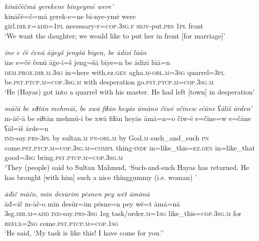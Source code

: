 \ea \label{ŽH.56}
\textit{kināčēčmā gerekene binyeymē were’} \\ 
\gll kināčē=č=mā gerek-e=ne bi-nye-ymē were \\ 
 girl\textsc{.dir}\textsc{\textsc{.f}}\textsc{=add}\textsc{=1pl} necessary\textsc{-f}\textsc{=cop}\textsc{.3sg}\textsc{\textsc{.f}} \textsc{sbjv-}put\textsc{.prs} \textsc{1pl} front \\ 
\glt `We want the daughter; we would like to put her in front [for marriage]'
\z 
 
\ea \label{ŽH.62}
\textit{īne e čē čenū āġeyš jengšā bīyen, be ādizī lūān} \\ 
\gll īne e=čē čenū āġe-ī=š jeng=šā bīye=n be ādizī lūā=n \\ 
 \textsc{dem.prox}\textsc{.dir}\textsc{.m}\textsc{.3sg} in=here with.ez\textsc{.gen} agha\textsc{.m}\textsc{-obl}\textsc{.m}\textsc{=3sg} quarrel\textsc{=3pl} be\textsc{.pst}\textsc{.ptcp}\textsc{.m}\textsc{=cop}\textsc{.3sg}\textsc{.m} with desperation go\textsc{.pst}\textsc{.ptcp}\textsc{.m}\textsc{=cop}\textsc{.3sg}\textsc{.m} \\ 
\glt `He (Hayas) got into a quarrel with his master. He had left [town] in desperation'
\z 
 
\ea \label{ŽH.66}
\textit{māčā be siɫtān mehmūī, be xwā fiɫān heyās āmāno čīwē ečīnew ečāne ʕāliš ārden’} \\ 
\gll m-āč-ā be siɫtān mehmū-ī be xwā fiɫān heyās āmā=n=o čīw-ē e=čīne=w e=čāne ʕāl=iš ārde=n \\ 
 \textsc{ind-}say\textsc{.prs}\textsc{-3pl} by sultan\textsc{.m} \textsc{pn}\textsc{-obl}\textsc{.m} by God\textsc{.m} such\_and\_such \textsc{pn} come\textsc{.pst}\textsc{.ptcp}\textsc{.m}\textsc{=cop}\textsc{.3sg}\textsc{.m}\textsc{=compl} thing\textsc{-indf} in=like\_this\textsc{=ez}\textsc{.gen} in=like\_that good\textsc{=3sg} bring\textsc{.pst}\textsc{.ptcp}\textsc{.m}\textsc{=cop}\textsc{.3sg}\textsc{.m} \\ 
\glt `They (people) said to Sultan Mahmud, ‘Such-and-such Hayas has returned. He has brought [with him] such a nice thinggummy (i.e. woman)  '
\z 
 
\ea \label{ŽH.78}
\textit{āđīč māčo, min desūrim pēsnen pey wēt āmānā} \\ 
\gll āđ=īč m-āč-o min desūr=im pēsne=n pey wē=t āmā=nā \\ 
 3sg\textsc{.dir}\textsc{.m}\textsc{=add} \textsc{ind-}say\textsc{.prs}\textsc{-3sg} 1sg task/order\textsc{.m}\textsc{=1sg} like\_this\textsc{=cop}\textsc{.3sg}\textsc{.m} for \textsc{reflx}\textsc{=\textsc{2sg}} come\textsc{.pst}\textsc{.ptcp}\textsc{.m}\textsc{=cop}\textsc{.1sg} \\ 
\glt `He said, ‘My task is like this! I have come for you.’'
\z 
 

